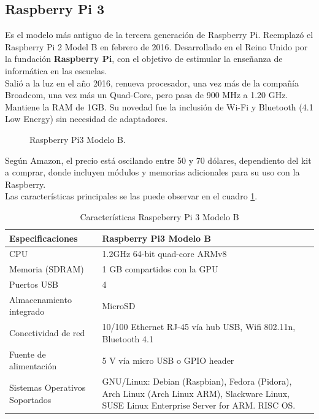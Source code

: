 \documentclass[conference]{IEEEtran}
\begin{document}
\subsection{Raspberry Pi 3}
Es el modelo más antiguo de la tercera generación de Raspberry Pi. Reemplazó el Raspberry Pi 2 Model B en febrero de 2016. Desarrollado en el Reino Unido por la fundación \textbf{Raspberry Pi}, con el objetivo de estimular la enseñanza de informática en las escuelas. \\
Salió a la luz en el año 2016, renueva procesador, una vez más de la compañía Broadcom, una vez más un Quad-Core, pero pasa de 900 MHz a 1.20 GHz. Mantiene la RAM de 1GB. Su novedad fue la inclusión de Wi-Fi y Bluetooth (4.1 Low Energy) sin necesidad de adaptadores.
\begin{figure}[h]
	\caption{Raspberry Pi3 Modelo B.}
	\label{fig:ant01}
\end{figure}
Según Amazon, el precio está oscilando entre 50 y 70 dólares, dependiento del kit a comprar, donde incluyen módulos y memorias adicionales para su uso con la Raspberry.\\
Las características principales se las puede observar en el cuadro \ref{tab:rb01}.
\begin{table}[tbp]
\begin{center}
	\begin{tabular}{|p{2.5cm}|p{5.5cm}|}
	\hline
	\textbf{Especificaciones} &\textbf{Raspberry Pi3 Modelo B} \\ \hline
	CPU  &1.2GHz 64-bit quad-core ARMv8 \\\hline
	Memoria (SDRAM) &1 GB compartidos con la GPU \\\hline
	Puertos USB &4 \\\hline
	Almacenamiento integrado &MicroSD \\\hline
	Conectividad de red &10/100 Ethernet RJ-45 vía hub USB, Wifi 802.11n, Bluetooth 4.1 \\\hline
	Fuente de alimentación &5 V vía micro USB o GPIO header \\\hline
	Sistemas Operativos Soportados &GNU/Linux: Debian (Raspbian), Fedora (Pidora), Arch Linux (Arch Linux ARM), Slackware Linux, SUSE Linux Enterprise Server for ARM. RISC OS.\\\hline
\end{tabular}\vspace{0.25cm}
\caption{Características Raspeberry Pi 3 Modelo B}
\label{tab:rb01}
\end{center}
\end{table}
\end{document}
